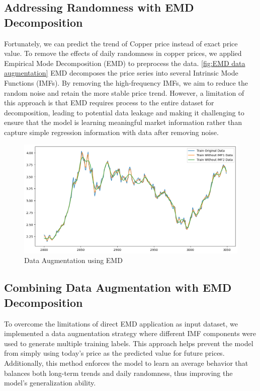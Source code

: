 \documentclass[final-report]{report-template}
\begin{document}
\subsection{Addressing Randomness with EMD Decomposition}
Fortunately, we can predict the trend of Copper price instead of exact price value. To remove the effects of daily randomness in copper prices, we applied Empirical Mode Decomposition (EMD) to preprocess the data. \autoref{fig:EMD data augmentation} EMD decomposes the price series into several Intrinsic Mode Functions (IMFs). By removing the high-frequency IMFs, we aim to reduce the random noise and retain the more stable price trend. However, a limitation of this approach is that EMD requires process to the entire dataset for decomposition, leading to potential data leakage and making it challenging to ensure that the model is learning meaningful market information rather than capture simple regression information with data after removing noise.
\begin{figure}
    \centering
    \includegraphics[width=1\linewidth]{figures/data_augmentation.png}
    \caption{Data Augmentation using EMD}
    \label{fig:EMD data augmentation}
\end{figure}
\subsection{Combining Data Augmentation with EMD Decomposition}
To overcome the limitations of direct EMD application as input dataset, we implemented a data augmentation strategy where different IMF components were used to generate multiple training labels. This approach helps prevent the model from simply using today's price as the predicted value for future prices. Additionally, this method enforces the model to learn an average behavior that balances both long-term trends and daily randomness, thus improving the model's generalization ability. 
\end{document}
